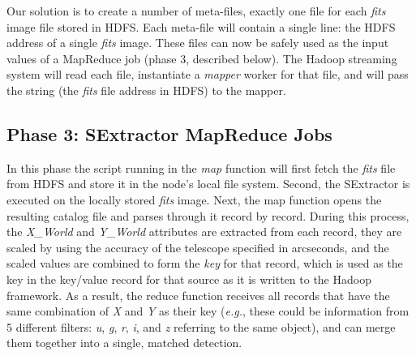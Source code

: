 Our solution is to create a number of meta-files, exactly one file for each \textit{fits} image file stored in HDFS. Each meta-file will contain a single line: the HDFS address of a single \textit{fits} image. 
These files can now be safely used as the input values of a MapReduce job (phase 3, described below). The Hadoop streaming system will read each file, instantiate a \textit{mapper} worker for that file, and will pass the string (the \textit{fits} file address in HDFS) to the mapper. 

\subsection{Phase 3: SExtractor MapReduce Jobs}
In this phase the script running in the \textit{map} function will first fetch the \textit{fits} file from HDFS and store it in the node's local file system. Second, the SExtractor is executed on the locally stored \textit{fits} image. Next, the map function opens the resulting catalog file and parses through it record by record. During this process, the \textit{X\_World} and \textit{Y\_World} attributes are extracted from each record, they are scaled by using the accuracy of the telescope specified in arcseconds, and the scaled values are combined to form the \textit{key} for that record, which is used as the key in the key/value record for that source as it is written to the Hadoop framework. As a result, the reduce function 
receives all  records that have the same combination of \textit{X} and \textit{Y} as their key (\textit{e.g.}, these could be information from 5 different filters: \textit{u}, \textit{g}, \textit{r}, \textit{i}, and \textit{z} referring to the same object), and can merge them together into a single, matched detection.


